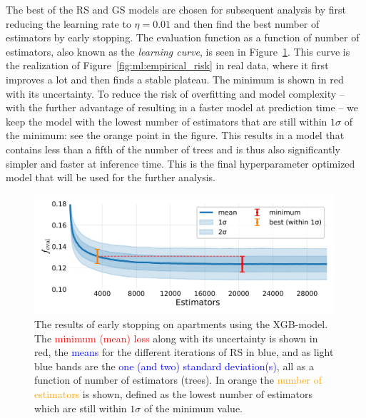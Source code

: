 The best of the RS and GS models are chosen for subsequent analysis by first reducing the learning rate to $\eta=0.01$ and then find the best number of estimators by early stopping. The evaluation function as a function of number of estimators, also known as the \emph{learning curve}, is seen in Figure~\ref{fig:h:CV_res_ES_learning_curve_ejer}. This curve is the realization of Figure~\ref{fig:ml:empirical_risk} in real data, where it first improves a lot and then finds a stable plateau. The minimum is shown in red with its uncertainty. To reduce the risk of overfitting and model complexity -- with the further advantage of resulting in a faster model at prediction time -- we keep the model with the lowest number of estimators that are still within $1\sigma$ of the minimum: see the orange point in the figure. This results in a model that contains less than a fifth of the number of trees and is thus also significantly simpler and faster at inference time. This is the final hyperparameter optimized model that will be used for the further analysis. 

\begin{figure}
  \centerfloat
  \includegraphics[draft=false, width=0.99\textwidth, trim=10 20 10 10, clip]{figures/housing/Ejerlejlighed_v19_cut_all_Ncols_all_xgb_early_stopping_fig.png}
  \caption[Early Stopping Results]
          {The results of early stopping on apartments using the XGB-model. The \textcolor{red}{minimum (mean) loss} along with its uncertainty is shown in red, the \textcolor{blue}{means} for the different iterations of RS in blue, and as light blue bands are the \textcolor{blue}{one (and two) standard deviation(s)}, all as a function of number of estimators (trees). In orange the \textcolor{orange}{ number of estimators} is shown, defined as the lowest number of estimators which are still within $1\sigma$ of the minimum value.} 
  \label{fig:h:CV_res_ES_learning_curve_ejer}
\end{figure}

\vspace{-0.5cm}


